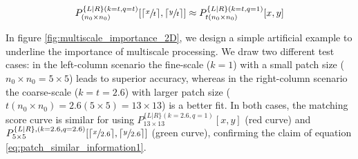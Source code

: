 \documentclass[runningheads]{llncs}
\begin{document}
\begin{gather} \label{eq:patch_similar_information1}
     P^{ \{L|R\} (k = t, q = t)}_{(n_0 \times n_0)}[\lceil \sfrac{x}{t} \rceil, \lceil \sfrac{y}{t} \rceil] \approx P^{ \{L|R\} (k = t, q = 1)}_{t(n_0 \times n_0)}[x,y] 
\end{gather}{}

In figure \ref{fig:multiscale_importance_2D}, we design a simple artificial example to underline the importance of multiscale processing. We draw two different test cases: in the left-column scenario the fine-scale ($k=1$) with a small patch size ($n_0 \times n_0 = 5 \times 5$) leads to superior accuracy, whereas in the right-column scenario the coarse-scale ($k=t=2.6$) with larger patch size ($t(n_0 \times n_0) = 2.6(5 \times 5) =13 \times 13$) is a better fit. In both cases, the matching score curve is similar for using $ P^{ \{L|R\} (k = 2.6, q = 1)}_{13 \times 13}[x,y] $ (red curve) and $P^{ \{L|R\}, (k = 2.6, q = 2.6)}_{5 \times 5}[\lceil \sfrac{x}{2.6} \rceil, \lceil \sfrac{y}{2.6} \rceil ]$ (green curve), confirming the claim of equation \ref{eq:patch_similar_information1}.
\end{document}
